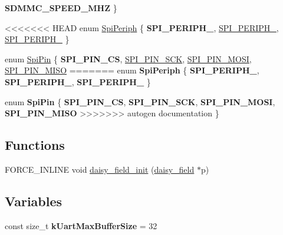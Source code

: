 \begin{DoxyCompactItemize}
{\bfseries S\+D\+M\+M\+C\+\_\+\+S\+P\+E\+E\+D\+\_\+M\+HZ}
 \}
\item 
<<<<<<< HEAD
enum \hyperlink{namespacedaisy_af711442ff4ba0ed7d1e6f6bae7c574b6}{Spi\+Periph} \{ {\bfseries S\+P\+I\+\_\+\+P\+E\+R\+I\+P\+H\+\_}, 
\hyperlink{namespacedaisy_af711442ff4ba0ed7d1e6f6bae7c574b6abe36a904be436f0e99a6c60bcdc5db03}{S\+P\+I\+\_\+\+P\+E\+R\+I\+P\+H\+\_}, 
\hyperlink{namespacedaisy_af711442ff4ba0ed7d1e6f6bae7c574b6a73dc62e39838820d4779ed3cbfc421c0}{S\+P\+I\+\_\+\+P\+E\+R\+I\+P\+H\+\_}
 \}
\item 
enum \hyperlink{namespacedaisy_ab9d0e8af9fe3d0320cdf38af4ec31a1a}{Spi\+Pin} \{ {\bfseries S\+P\+I\+\_\+\+P\+I\+N\+\_\+\+CS}, 
\hyperlink{namespacedaisy_ab9d0e8af9fe3d0320cdf38af4ec31a1aaf0815c8244af198ed0fddd44cb62b8bd}{S\+P\+I\+\_\+\+P\+I\+N\+\_\+\+S\+CK}, 
\hyperlink{namespacedaisy_ab9d0e8af9fe3d0320cdf38af4ec31a1aadbc82a205c33fae68c5acd4d11f909c0}{S\+P\+I\+\_\+\+P\+I\+N\+\_\+\+M\+O\+SI}, 
\hyperlink{namespacedaisy_ab9d0e8af9fe3d0320cdf38af4ec31a1aaf95730671f55a42b4d7012faea2f27c7}{S\+P\+I\+\_\+\+P\+I\+N\+\_\+\+M\+I\+SO}
=======
\mbox{\label{namespacedaisy_af711442ff4ba0ed7d1e6f6bae7c574b6}} 
enum {\bfseries Spi\+Periph} \{ {\bfseries S\+P\+I\+\_\+\+P\+E\+R\+I\+P\+H\+\_}, 
{\bfseries S\+P\+I\+\_\+\+P\+E\+R\+I\+P\+H\+\_}, 
{\bfseries S\+P\+I\+\_\+\+P\+E\+R\+I\+P\+H\+\_}
 \}
\item 
\mbox{\label{namespacedaisy_ab9d0e8af9fe3d0320cdf38af4ec31a1a}} 
enum {\bfseries Spi\+Pin} \{ {\bfseries S\+P\+I\+\_\+\+P\+I\+N\+\_\+\+CS}, 
{\bfseries S\+P\+I\+\_\+\+P\+I\+N\+\_\+\+S\+CK}, 
{\bfseries S\+P\+I\+\_\+\+P\+I\+N\+\_\+\+M\+O\+SI}, 
{\bfseries S\+P\+I\+\_\+\+P\+I\+N\+\_\+\+M\+I\+SO}
>>>>>>> autogen documentation
 \}
\end{DoxyCompactItemize}
\subsection*{Functions}
\begin{DoxyCompactItemize}
\item 
F\+O\+R\+C\+E\+\_\+\+I\+N\+L\+I\+NE void \hyperlink{namespacedaisy_a49462ee18989a9c75b51b2cf864f3536}{daisy\+\_\+field\+\_\+init} (\hyperlink{structdaisy_1_1daisy__field}{daisy\+\_\+field} $\ast$p)
\end{DoxyCompactItemize}
\subsection*{Variables}
\begin{DoxyCompactItemize}
\item 
\mbox{\label{namespacedaisy_a38e74b71650c295dc232837068d63ef0}} 
const size\+\_\+t {\bfseries k\+Uart\+Max\+Buffer\+Size} = 32
\end{DoxyCompactItemize}


